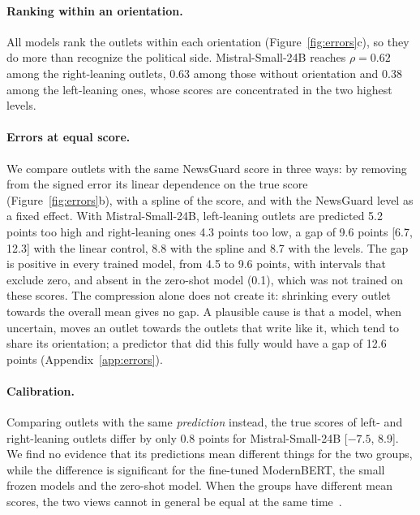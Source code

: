 \documentclass[11pt,a4paper]{article}
\begin{document}
\paragraph{Ranking within an orientation.} All models rank the outlets within each orientation
(Figure~\ref{fig:errors}c), so they do more than recognize the political side. Mistral-Small-24B reaches $\rho = 0.62$
among the right-leaning outlets, 0.63 among those without orientation and 0.38 among the left-leaning ones, whose scores
are concentrated in the two highest levels.

\paragraph{Errors at equal score.} We compare outlets with the same NewsGuard score in three ways: by removing from the
signed error its linear dependence on the true score (Figure~\ref{fig:errors}b), with a spline of the score, and with the
NewsGuard level as a fixed effect. With Mistral-Small-24B, left-leaning outlets are predicted 5.2 points too high and
right-leaning ones 4.3 points too low, a gap of 9.6 points [6.7, 12.3] with the linear control, 8.8 with the spline and
8.7 with the levels. The gap is positive in every trained model, from 4.5 to 9.6 points, with intervals that exclude
zero, and absent in the zero-shot model (0.1), which was not trained on these scores. The compression alone does not
create it: shrinking every outlet towards the overall mean gives no gap. A plausible cause is that a model, when
uncertain, moves an outlet towards the outlets that write like it, which tend to share its orientation; a predictor that
did this fully would have a gap of 12.6 points (Appendix~\ref{app:errors}).

\paragraph{Calibration.} Comparing outlets with the same \emph{prediction} instead, the true scores of left- and
right-leaning outlets differ by only 0.8 points for Mistral-Small-24B [$-7.5$, 8.9]. We find no evidence that its
predictions mean different things for the two groups, while the difference is significant for the fine-tuned ModernBERT,
the small frozen models and the zero-shot model. When the groups have different mean scores, the two views cannot in
general be equal at the same time~\cite{kleinberg2017inherent,chouldechova2017fair}.
\end{document}
